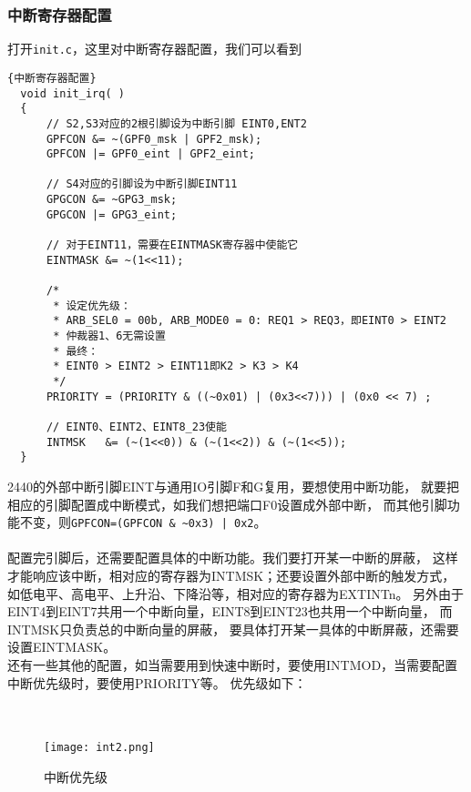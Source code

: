 \subsubsection{中断寄存器配置}
打开\lstinline{init.c}，这里对中断寄存器配置，我们可以看到
\lstset{language=C}
\begin{lstlisting}{中断寄存器配置}
  void init_irq( )
  {
      // S2,S3对应的2根引脚设为中断引脚 EINT0,ENT2
      GPFCON &= ~(GPF0_msk | GPF2_msk);
      GPFCON |= GPF0_eint | GPF2_eint;
  
      // S4对应的引脚设为中断引脚EINT11
      GPGCON &= ~GPG3_msk;
      GPGCON |= GPG3_eint;
      
      // 对于EINT11，需要在EINTMASK寄存器中使能它
      EINTMASK &= ~(1<<11);
          
      /*
       * 设定优先级：
       * ARB_SEL0 = 00b, ARB_MODE0 = 0: REQ1 > REQ3，即EINT0 > EINT2
       * 仲裁器1、6无需设置
       * 最终：
       * EINT0 > EINT2 > EINT11即K2 > K3 > K4
       */
      PRIORITY = (PRIORITY & ((~0x01) | (0x3<<7))) | (0x0 << 7) ;
  
      // EINT0、EINT2、EINT8_23使能
      INTMSK   &= (~(1<<0)) & (~(1<<2)) & (~(1<<5));
  }
\end{lstlisting}
2440的外部中断引脚EINT与通用IO引脚F和G复用，要想使用中断功能，
就要把相应的引脚配置成中断模式，如我们想把端口F0设置成外部中断，
而其他引脚功能不变，则\lstinline{GPFCON=(GPFCON & ~0x3) | 0x2}。 \\
\\
配置完引脚后，还需要配置具体的中断功能。我们要打开某一中断的屏蔽，
这样才能响应该中断，相对应的寄存器为INTMSK；还要设置外部中断的触发方式，
如低电平、高电平、上升沿、下降沿等，相对应的寄存器为EXTINTn。
另外由于EINT4到EINT7共用一个中断向量，EINT8到EINT23也共用一个中断向量，
而INTMSK只负责总的中断向量的屏蔽，
要具体打开某一具体的中断屏蔽，还需要设置EINTMASK。\\

还有一些其他的配置，如当需要用到快速中断时，要使用INTMOD，当需要配置中断优先级时，要使用PRIORITY等。
优先级如下：\\
\\
\\
\begin{figure}[htbp]
  \centering
  \texttt{[image: int2.png]}
  \caption{中断优先级}
\end{figure}


